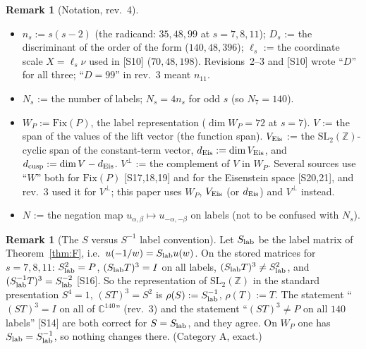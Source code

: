 \documentclass[11pt]{article}
\theoremstyle{definition}
\newtheorem{remark}[theorem]{Remark}
\newcommand{\Z}{\mathbb{Z}}
\newcommand{\C}{\mathbb{C}}
\newcommand{\src}[1]{\textup{[S#1]}}
\begin{document}
\begin{remark}[Notation, rev.~4]\label{rem:notation}
\begin{itemize}[leftmargin=2em]
\item $n_s:=s(s-2)$ (the radicand: $35,48,99$ at $s=7,8,11$); $D_s$ := the discriminant of the order of the form ($140,48,396$); $\ell_s$ := the coordinate
scale $X=\ell_s\nu$ used in \src{10} ($70,48,198$). Revisions~2--3 and \src{10} wrote ``$D$'' for all three; ``$D=99$'' in rev.~3 meant $n_{11}$.
\item $N_s$ := the number of labels; $N_s=4n_s$ for odd $s$ (so $N_7=140$).
\item $W_P:=\mathrm{Fix}(P)$, the label representation ($\dim W_P=72$ at $s=7$). $V$ := the span of the values of the lift vector (the function span).
$V_{\rm Eis}$ := the $\mathrm{SL}_2(\Z)$-cyclic span of the constant-term vector, $d_{\rm Eis}:=\dim V_{\rm Eis}$, and $d_{\rm cusp}:=\dim V-d_{\rm Eis}$.
$V^\perp$ := the complement of $V$ in $W_P$. Several sources use ``$W$'' both for $\mathrm{Fix}(P)$ \src{17,18,19} and for the Eisenstein space \src{20,21},
and rev.~3 used it for $V^\perp$; this paper uses $W_P$, $V_{\rm Eis}$ (or $d_{\rm Eis}$) and $V^\perp$ instead.
\item $N$ := the negation map $u_{\alpha,\beta}\mapsto u_{-\alpha,-\beta}$ on labels (not to be confused with $N_s$).
\end{itemize}
\end{remark}

\begin{remark}[The $S$ versus $S^{-1}$ label convention]\label{rem:Sconv}
Let $S_{\rm lab}$ be the label matrix of Theorem~\ref{thm:F}, i.e.\ $u(-1/w)=S_{\rm lab}u(w)$. On the stored matrices for $s=7,8,11$:
$S_{\rm lab}^2=P$, $(S_{\rm lab}T)^3=I$ on all labels, $(S_{\rm lab}T)^3\neq S_{\rm lab}^2$, and $(S_{\rm lab}^{-1}T)^3=S_{\rm lab}^{-2}$ \src{16}. So the representation of
$\mathrm{SL}_2(\Z)$ in the standard presentation $S^4=1$, $(ST)^3=S^2$ is $\rho(S):=S_{\rm lab}^{-1}$, $\rho(T):=T$. The statement ``$(ST)^3=I$ on all of $\C^{140}$''
(rev.~3) and the statement ``$(ST)^3\neq P$ on all $140$ labels'' \src{14} are both correct for $S=S_{\rm lab}$, and they agree. On $W_P$ one has $S_{\rm lab}=S_{\rm lab}^{-1}$,
so nothing changes there. (Category A, exact.)
\end{remark}
\end{document}
